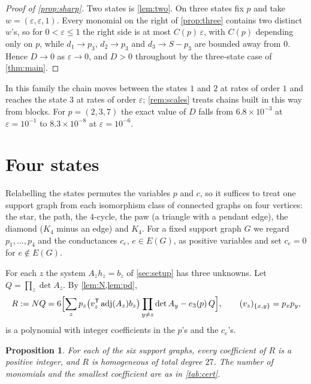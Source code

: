 \documentclass[11pt,a4paper]{article}
\numberwithin{equation}{section}
\newtheorem{proposition}[theorem]{Proposition}
\theoremstyle{remark}
\newcommand{\eps}{\varepsilon}
\begin{document}
\begin{proof}[Proof of \cref{prop:sharp}]
Two states is \cref{lem:two}. On three states fix $p$ and take $w=(\eps,\eps,1)$. Every monomial on the right of \cref{prop:three} contains two distinct $w$'s, so for $0<\eps\le1$ the right side is at most $C(p)\,\eps$, with $C(p)$ depending only on $p$, while $d_1\to p_3$, $d_2\to p_3$ and $d_3\to S-p_3$ are bounded away from $0$. Hence $D\to0$ as $\eps\to0$, and $D>0$ throughout by the three-state case of \cref{thm:main}.
\end{proof}

In this family the chain moves between the states $1$ and $2$ at rates of order $1$ and reaches the state $3$ at rates of order $\eps$; \cref{rem:scales} treats chains built in this way from blocks. For $p=(2,3,7)$ the exact value of $D$ falls from $6.8\times10^{-3}$ at $\eps=10^{-1}$ to $8.3\times10^{-8}$ at $\eps=10^{-6}$.

\section{Four states}\label{sec:four}

Relabelling the states permutes the variables $p$ and $c$, so it suffices to treat one support graph from each isomorphism class of connected graphs on four vertices: the star, the path, the $4$-cycle, the paw (a triangle with a pendant edge), the diamond ($K_4$ minus an edge) and $K_4$. For a fixed support graph $G$ we regard $p_1,\dots,p_4$ and the conductances $c_e$, $e\in E(G)$, as positive variables and set $c_e=0$ for $e\notin E(G)$.

For each $z$ the system $A_zh_z=b_z$ of \cref{sec:setup} has three unknowns. Let $Q=\prod_z\det A_z$. By \cref{lem:N,lem:pd},
\[
R:=NQ=6\Bigl[\sum_zp_z\bigl(v_z^{\mathsf T}\operatorname{adj}(A_z)b_z\bigr)\prod_{y\ne z}\det A_y-e_3(p)\,Q\Bigr],\qquad (v_z)_{\{x,y\}}=p_xp_y,
\]
is a polynomial with integer coefficients in the $p$'s and the $c_e$'s.

\begin{proposition}\label{prop:cert}
For each of the six support graphs, every coefficient of $R$ is a positive integer, and $R$ is homogeneous of total degree $27$. The number of monomials and the smallest coefficient are as in \cref{tab:cert}.
\end{proposition}
\end{document}
